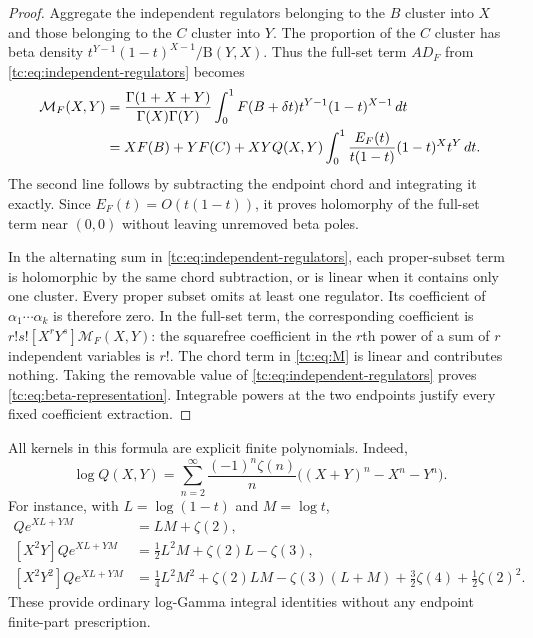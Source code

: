 \documentclass[11pt,a4paper]{article}
\numberwithin{equation}{section}
\theoremstyle{definition}
\theoremstyle{remark}
\begin{document}
\begin{proof}
Aggregate the independent regulators belonging to the $B$ cluster
into $X$ and those belonging to the $C$ cluster into $Y$.  The
proportion of the $C$ cluster has beta density
$t^{Y-1}(1-t)^{X-1}/\mathrm B(Y,X)$.  Thus the full-set term
$AD_F$ from \eqref{tc:eq:independent-regulators} becomes
\begin{align}
 \mathcal M_F(X,Y)
 &=\frac{\Gamma(1+X+Y)}{\Gamma(X)\Gamma(Y)}
     \int_0^1 F(B+\delta t)t^{Y-1}(1-t)^{X-1}\,dt\notag\\
 &=XF(B)+YF(C)
   +XYQ(X,Y)\int_0^1
          \frac{E_F(t)}{t(1-t)}(1-t)^Xt^Y\,dt.
                                                     \label{tc:eq:M}
\end{align}
The second line follows by subtracting the endpoint chord and
integrating it exactly.  Since $E_F(t)=O(t(1-t))$, it proves
holomorphy of the full-set term near $(0,0)$ without leaving
unremoved beta poles.

In the alternating sum in \eqref{tc:eq:independent-regulators},
each proper-subset term is holomorphic by the same chord
subtraction, or is linear when it contains only one cluster.
Every proper subset omits at least one regulator.  Its coefficient
of $\alpha_1\cdots\alpha_k$ is therefore zero.  In the full-set term,
the corresponding coefficient is
$r!s![X^rY^s]\mathcal M_F(X,Y)$: the squarefree coefficient in the
$r$th power of a sum of $r$ independent variables is $r!$.
The chord term in \eqref{tc:eq:M} is linear and contributes nothing.
Taking the removable value of
\eqref{tc:eq:independent-regulators} proves
\eqref{tc:eq:beta-representation}.  Integrable powers at the two
endpoints justify every fixed coefficient extraction.
\end{proof}

All kernels in this formula are explicit finite polynomials.  Indeed,
\begin{equation}\label{tc:eq:logQ}
 \log Q(X,Y)=\sum_{n=2}^{\infty}
  \frac{(-1)^n\zeta(n)}n
      \bigl((X+Y)^n-X^n-Y^n\bigr).
\end{equation}
For instance, with $L=\log(1-t)$ and $M=\log t$,
\begin{align}
 [XY]Qe^{XL+YM}&=LM+\zeta(2),\label{tc:eq:kernel22}\\
 [X^2Y]Qe^{XL+YM}&=\tfrac12L^2M+\zeta(2)L-\zeta(3),\\
 [X^2Y^2]Qe^{XL+YM}
  &=\tfrac14L^2M^2+\zeta(2)LM-\zeta(3)(L+M)
      +\tfrac32\zeta(4)+\tfrac12\zeta(2)^2.
\end{align}
These provide ordinary log-Gamma integral identities without any
endpoint finite-part prescription.
\end{document}
